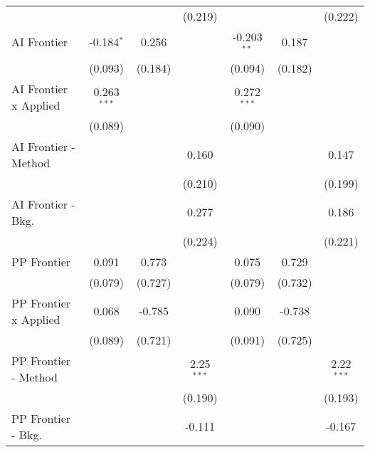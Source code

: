 \begin{tabular}{lcccccc}
                                  &                &              & (0.219)       &                &              & (0.222)\\   
   AI Frontier                    & -0.184$^{*}$   & 0.256        &               & -0.203$^{**}$  & 0.187        &   \\   
                                  & (0.093)        & (0.184)      &               & (0.094)        & (0.182)      &   \\   
   AI Frontier x Applied          & 0.263$^{***}$  &              &               & 0.272$^{***}$  &              &   \\   
                                  & (0.089)        &              &               & (0.090)        &              &   \\   
   AI Frontier - Method           &                &              & 0.160         &                &              & 0.147\\   
                                  &                &              & (0.210)       &                &              & (0.199)\\   
   AI Frontier - Bkg.             &                &              & 0.277         &                &              & 0.186\\   
                                  &                &              & (0.224)       &                &              & (0.221)\\   
   PP Frontier                    & 0.091          & 0.773        &               & 0.075          & 0.729        &   \\   
                                  & (0.079)        & (0.727)      &               & (0.079)        & (0.732)      &   \\   
   PP Frontier x Applied          & 0.068          & -0.785       &               & 0.090          & -0.738       &   \\   
                                  & (0.089)        & (0.721)      &               & (0.091)        & (0.725)      &   \\   
   PP Frontier - Method           &                &              & 2.25$^{***}$  &                &              & 2.22$^{***}$\\   
                                  &                &              & (0.190)       &                &              & (0.193)\\   
   PP Frontier - Bkg.             &                &              & -0.111        &                &              & -0.167\\   

\end{tabular}
